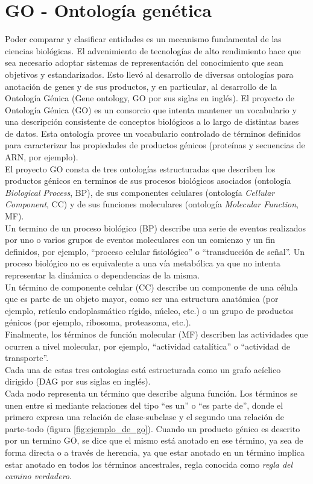 \section{GO - Ontología genética}
Poder comparar y clasificar entidades es un mecanismo fundamental de las ciencias biológicas. El advenimiento de tecnologías de alto rendimiento hace que sea necesario adoptar sistemas de representación del conocimiento que sean objetivos y estandarizados. Esto llevó al desarrollo de diversas ontologías para anotación de genes y de sus productos, y en particular, al desarrollo de la Ontología Génica (Gene ontology, GO por sus siglas en inglés).
El proyecto de Ontología Génica (GO) es un consorcio que intenta mantener un vocabulario y una descripción consistente de conceptos biológicos a lo largo de distintas bases de datos. Esta ontología provee un vocabulario controlado de términos definidos para caracterizar las propiedades de productos génicos (proteínas y secuencias de ARN, por ejemplo).\\
El proyecto GO consta de tres ontologías estructuradas que describen los productos génicos en terminos de sus procesos biológicos asociados (ontología \textit{Biological Process}, BP), de sus componentes celulares (ontología \textit{Cellular Component}, CC) y de sus funciones moleculares (ontología \textit{Molecular Function}, MF).\\
Un termino de un proceso biológico (BP) describe una serie de eventos realizados por uno o varios grupos de eventos moleculares con un comienzo y un fin definidos, por ejemplo, ``proceso celular fisiológico'' o ``transducción de señal''. Un proceso biológico no es equivalente a una vía metabólica ya que no intenta representar la dinámica o dependencias de la misma.\\
Un término de componente celular (CC) describe un componente de una célula que es parte de un objeto mayor, como ser una estructura anatómica (por ejemplo, retículo endoplasmático rígido, núcleo, etc.) o un grupo de productos génicos (por ejemplo, ribosoma, proteasoma, etc.).\\
Finalmente, los términos de función molecular (MF) describen las actividades que ocurren a nivel molecular, por ejemplo, ``actividad catalítica'' o ``actividad de transporte''.\\
Cada una de estas tres ontologias está estructurada como un grafo acíclico dirigido (DAG por sus siglas en inglés).\\
Cada nodo representa un término que describe alguna función. Los términos se unen entre si mediante relaciones del tipo ``es un'' o ``es parte de'', donde el primero expresa una relación de clase-subclase y el segundo una relación de parte-todo (figura \ref{fig:ejemplo_de_go}). Cuando un producto génico es descrito por un termino GO, se dice que el mismo está anotado en ese término, ya sea de forma directa o a través de herencia, ya que estar anotado en un término implica estar anotado en todos los términos ancestrales, regla conocida como \textit{regla del camino verdadero}.\\
